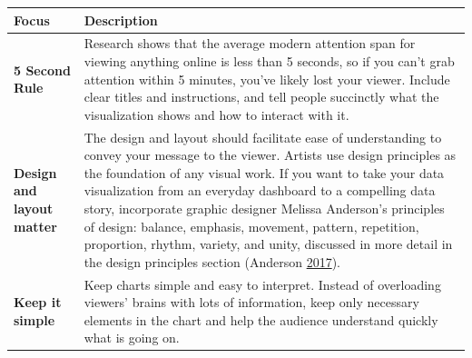 \documentclass[]{book}
\begin{document}
\begin{longtable}[]{@{}ll@{}}
\toprule
\begin{minipage}[b]{0.19\columnwidth}\raggedright\strut
\textbf{Focus}\strut
\end{minipage} & \begin{minipage}[b]{0.75\columnwidth}\raggedright\strut
\textbf{Description}\strut
\end{minipage}\tabularnewline
\midrule
\endhead
\begin{minipage}[t]{0.19\columnwidth}\raggedright\strut
\textbf{5 Second Rule}\strut
\end{minipage} & \begin{minipage}[t]{0.75\columnwidth}\raggedright\strut
Research shows that the average modern attention span for viewing
anything online is less than 5 seconds, so if you can't grab attention
within 5 minutes, you've likely lost your viewer. Include clear titles
and instructions, and tell people succinctly what the visualization
shows and how to interact with it.\strut
\end{minipage}\tabularnewline
\begin{minipage}[t]{0.19\columnwidth}\raggedright\strut
\textbf{Design and layout matter}\strut
\end{minipage} & \begin{minipage}[t]{0.75\columnwidth}\raggedright\strut
The design and layout should facilitate ease of understanding to convey
your message to the viewer. Artists use design principles as the
foundation of any visual work. If you want to take your data
visualization from an everyday dashboard to a compelling data story,
incorporate graphic designer Melissa Anderson's principles of design:
balance, emphasis, movement, pattern, repetition, proportion, rhythm,
variety, and unity, discussed in more detail in the design principles
section (Anderson
\protect\hyperlink{ref-design_principles}{2017}).\strut
\end{minipage}\tabularnewline
\begin{minipage}[t]{0.19\columnwidth}\raggedright\strut
\textbf{Keep it simple}\strut
\end{minipage} & \begin{minipage}[t]{0.75\columnwidth}\raggedright\strut
Keep charts simple and easy to interpret. Instead of overloading
viewers' brains with lots of information, keep only necessary elements
in the chart and help the audience understand quickly what is going
on.\strut
\end{minipage}\tabularnewline

\end{longtable}
\end{document}
